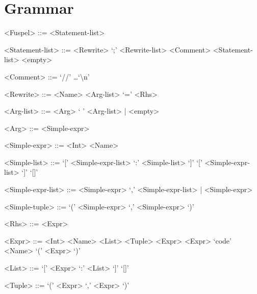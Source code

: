 \section{Grammar}
\label{sec:grammar}

\setlength{\grammarparsep}{4pt}
\setlength{\grammarindent}{10em}
\begin{grammar}
	<Fuspel> ::= <Statement-list>

	<Statement-list> ::= <Rewrite> `;' <Rewrite-list>
		\alt <Comment> <Statement-list>
		\alt <empty>

	<Comment> ::= `//' \dots `\textbackslash n'

	<Rewrite> ::= <Name> <Arg-list> `=' <Rhs>

	<Arg-list> ::= <Arg> ` ' <Arg-list> | <empty>

	<Arg> ::= <Simple-expr>

	<Simple-expr> ::= <Int>
		\alt <Simple-list>
		\alt <Simple-tuple>

	<Simple-list> ::= `[' <Simple-expr-list> `:' <Simple-list> `]'
		\alt `[' <Simple-expr-list> `]'
		\alt `[]'

	<Simple-expr-list> ::= <Simple-expr> `,' <Simple-expr-list> | <Simple-expr>
	
	<Simple-tuple> ::= `(' <Simple-expr> `,' <Simple-expr> `)'

	<Rhs> ::= <Expr>

	<Expr> ::= <Int>
		\alt <Tuple>
		 <Expr>
		\alt `code' <Name>
		\alt `(' <Expr> `)'

	<List> ::= `[' <Expr> `:' <List> `]'
		\alt `[]'
	
	<Tuple> ::= `(' <Expr> `,' <Expr> `)'
\end{grammar}
